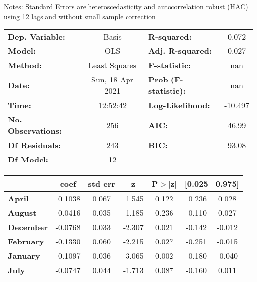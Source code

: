 Notes: \newline
 [1] Standard Errors are heteroscedasticity and autocorrelation robust (HAC) using 12 lags and without small sample correction
\begin{center}
\begin{tabular}{lclc}
\toprule
\textbf{Dep. Variable:}    &      Basis       & \textbf{  R-squared:         } &     0.072   \\
\textbf{Model:}            &       OLS        & \textbf{  Adj. R-squared:    } &     0.027   \\
\textbf{Method:}           &  Least Squares   & \textbf{  F-statistic:       } &       nan   \\
\textbf{Date:}             & Sun, 18 Apr 2021 & \textbf{  Prob (F-statistic):} &      nan    \\
\textbf{Time:}             &     12:52:42     & \textbf{  Log-Likelihood:    } &   -10.497   \\
\textbf{No. Observations:} &         256      & \textbf{  AIC:               } &     46.99   \\
\textbf{Df Residuals:}     &         243      & \textbf{  BIC:               } &     93.08   \\
\textbf{Df Model:}         &          12      & \textbf{                     } &             \\
\bottomrule
\end{tabular}
\begin{tabular}{lcccccc}
                   & \textbf{coef} & \textbf{std err} & \textbf{z} & \textbf{P$> |$z$|$} & \textbf{[0.025} & \textbf{0.975]}  \\
\midrule
\textbf{April}     &      -0.1038  &        0.067     &    -1.545  &         0.122        &       -0.236    &        0.028     \\
\textbf{August}    &      -0.0416  &        0.035     &    -1.185  &         0.236        &       -0.110    &        0.027     \\
\textbf{December}  &      -0.0768  &        0.033     &    -2.307  &         0.021        &       -0.142    &       -0.012     \\
\textbf{February}  &      -0.1330  &        0.060     &    -2.215  &         0.027        &       -0.251    &       -0.015     \\
\textbf{January}   &      -0.1097  &        0.036     &    -3.065  &         0.002        &       -0.180    &       -0.040     \\
\textbf{July}      &      -0.0747  &        0.044     &    -1.713  &         0.087        &       -0.160    &        0.011     \\

\end{tabular}
\end{center}
